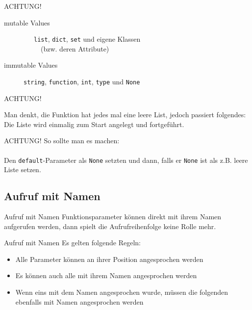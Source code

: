 \begin{frame}{ACHTUNG!}
	\\[1cm]
	\begin{description}
		\item[mutable Values] \ \ \ \texttt{list}, \texttt{dict}, \texttt{set} und eigene Klassen \\
\ \ \ \ \ (bzw. deren Attribute)
		\item[immutable Values] \texttt{string}, \texttt{function}, \texttt{int}, \texttt{type} und \texttt{None}
	\end{description}
\end{frame}

\begin{frame}{ACHTUNG!}
	
	Man denkt, die Funktion hat jedes mal eine leere List, jedoch passiert folgendes:\\
	
	Die Liste wird einmalig zum Start angelegt und fortgeführt.
\end{frame}

\begin{frame}[fragile]{ACHTUNG!}
	So sollte man es machen:\\[.5cm]
	
	\ \\[.5cm]
	Den \texttt{default}-Parameter als \texttt{None} setzten und dann, falls er \texttt{None} ist als z.B. leere Liste setzen.
\end{frame}


\subsection{Aufruf mit Namen}
\begin{frame}[fragile]{Aufruf mit Namen}
	Funktionsparameter können direkt mit ihrem Namen aufgerufen werden, dann spielt die Aufrufreihenfolge keine Rolle mehr.\\[1cm]
	
\end{frame}

\begin{frame}{Aufruf mit Namen}
	Es gelten folgende Regeln:
	\begin{itemize}
		\item Alle Parameter können an ihrer Position angesprochen werden
		\item Es können auch alle mit ihrem Namen angesprochen werden
		\item Wenn eins mit dem Namen angesprochen wurde, m\"ussen die folgenden ebenfalls mit Namen angesprochen werden
	\end{itemize}
\end{frame}

